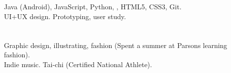 \begin{resume}
\section{}
Java (Android), JavaScript, Python, \Cplusplus, HTML5, CSS3, Git.\\
UI+UX design. Prototyping, user study.

\section{}
Graphic design, illustrating, fashion (Spent a summer at Parsons learning fashion). \\
Indie music. Tai-chi (Certified National Athlete).

\end{resume}

